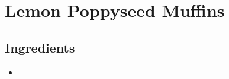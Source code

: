 \thispagestyle{fancy}
\section{Lemon Poppyseed Muffins}
\AddToShipoutPicture*{\LemonPoppyseed}

\subsection*{Ingredients}
\begin{multicols}{3}
	\begin{itemize}
		\item 
	\end{itemize}
\end{multicols}
